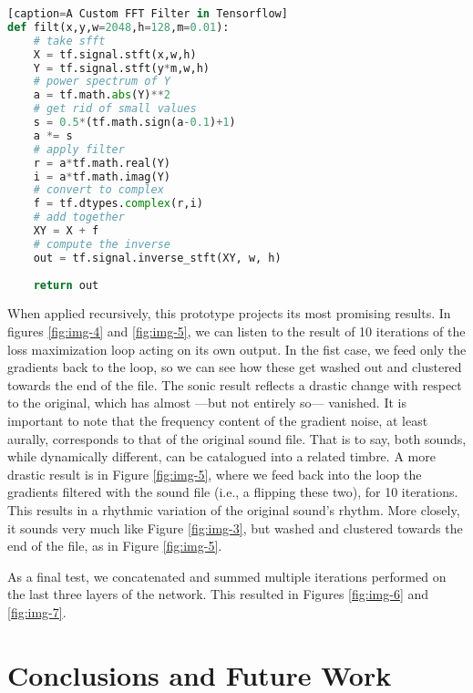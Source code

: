 \documentclass[a4paper,10pt,oneside]{article}
\begin{document}
\begin{sloppy}
\begin{lstlisting}[language=Python][caption=A Custom FFT Filter in Tensorflow]
def filt(x,y,w=2048,h=128,m=0.01):
    # take sfft
    X = tf.signal.stft(x,w,h)
    Y = tf.signal.stft(y*m,w,h)
    # power spectrum of Y
    a = tf.math.abs(Y)**2
    # get rid of small values
    s = 0.5*(tf.math.sign(a-0.1)+1)
    a *= s 
    # apply filter
    r = a*tf.math.real(Y)
    i = a*tf.math.imag(Y)
    # convert to complex
    f = tf.dtypes.complex(r,i)
    # add together
    XY = X + f
    # compute the inverse
    out = tf.signal.inverse_stft(XY, w, h)
    
    return out
\end{lstlisting}
When applied recursively, this prototype projects its most promising results. In figures \ref{fig:img-4} and \ref{fig:img-5}, we can listen to the result of 10 iterations of the loss maximization loop acting on its own output. In the fist case, we feed only the gradients back to the loop, so we can see how these get washed out and clustered towards the end of the file. The sonic result reflects a drastic change with respect to the original, which has almost ---but not entirely so--- vanished. It is important to note that the frequency content of the gradient noise, at least aurally, corresponds to that of the original sound file. That is to say, both sounds, while dynamically different, can be catalogued into a related timbre. A more drastic result is in Figure \ref{fig:img-5}, where we feed back into the loop the gradients filtered with the sound file (i.e., a flipping these two), for 10 iterations. This results in a rhythmic variation of the original sound's rhythm. More closely, it sounds very much like Figure \ref{fig:img-3}, but washed and clustered towards the end of the file, as in Figure \ref{fig:img-5}. 

As a final test, we concatenated and summed multiple iterations performed on the last three layers of the network. This resulted in Figures  \ref{fig:img-6} and  \ref{fig:img-7}.


\section{Conclusions and Future Work}


\end{sloppy}
\end{document}
